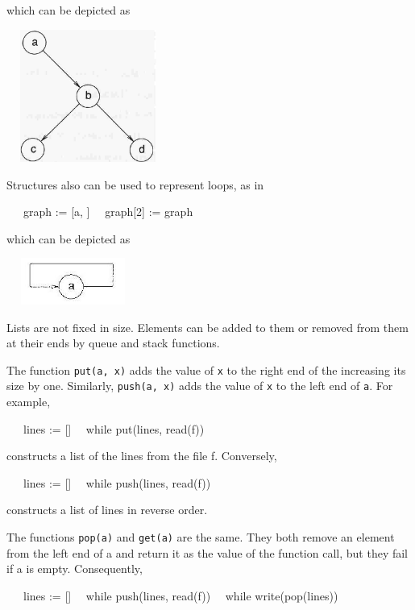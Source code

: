 \noindent which can be depicted as

\ \  \includegraphics[width=1.8161in,height=1.7134in]{ib-img/ib-img002.jpg} 

Structures also can be used to represent loops, as in

{\ttfamily\mdseries
\ \ \ graph := [{\textquotedbl}a{\textquotedbl}, {\textquotedbl}{\textquotedbl}]\newline
 \ \ graph[2] := graph}

\noindent which can be depicted as

\ \  \includegraphics[width=1.4193in,height=0.5992in]{ib-img/ib-img003.jpg} 

Lists are not fixed in size. Elements can be added to them or removed
from them at their ends by queue and stack functions.

The function \texttt{put(a, x)} adds the value of \texttt{x} to the
right end of the increasing its size by one.  Similarly,
\texttt{push(a, x)} adds the value of \texttt{x} to the left end of
\texttt{a}. For example,

{\ttfamily\mdseries
\ \ \ lines := []\newline
 \ \ while put(lines, read(f))}

\noindent constructs a list of the lines from the file f. Conversely,

{\ttfamily\mdseries
\ \ \ lines := []\newline
 \ \ while push(lines, read(f))}

\noindent constructs a list of lines in reverse order.

The functions \texttt{pop(a)} and \texttt{get(a)} are the same. They
both remove an element from the left end of a and return it as the
value of the function call, but they fail if a is empty. Consequently,

{\ttfamily\mdseries
\ \ \ lines := []\newline
 \ \ while push(lines, read(f))\newline
 \ \ while write(pop(lines))}


